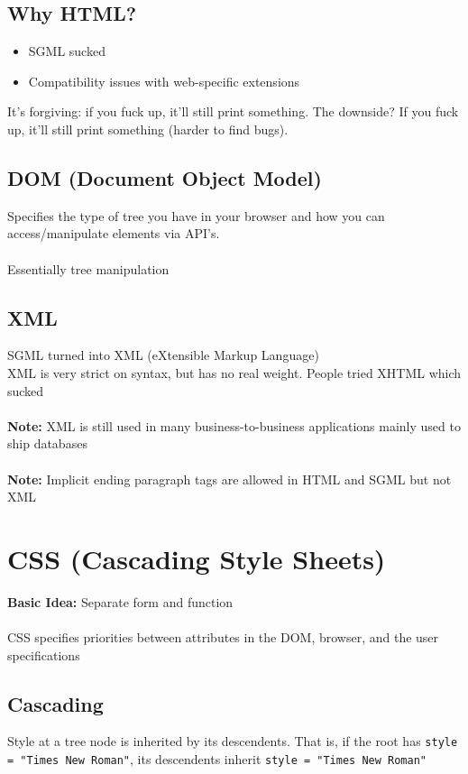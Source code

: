 \documentclass[13pt]{article}
\begin{document}
\subsection{Why HTML?}
\begin{itemize}[leftmargin = 0pt]
\item [] SGML sucked
\item [] Compatibility issues with web-specific extensions
\end{itemize}
It's forgiving: if you fuck up, it'll still print something. The downside? If you fuck up, it'll still print something (harder to find bugs).

\subsection{DOM (Document Object Model)}
Specifies the type of tree you have in your browser and how you can access/manipulate elements via API's. \\ \\
Essentially tree manipulation

\subsection{XML}
SGML turned into XML (eXtensible Markup Language) \\
XML is very strict on syntax, but has no real weight. People tried XHTML which sucked \\ \\
\textbf{Note:} XML is still used in many business-to-business applications mainly used to ship databases \\ \\
\textbf{Note:} Implicit ending paragraph tags are allowed in HTML and SGML but not XML

\section{CSS (Cascading Style Sheets)}
\textbf{Basic Idea:} Separate form and function \\ \\
CSS specifies priorities between attributes in the DOM, browser, and the user specifications

\subsection{Cascading}
Style at a tree node is inherited by its descendents. That is, if the root has \texttt{style = "Times New Roman"}, its descendents inherit \texttt{style = "Times New Roman"}
\end{document}
